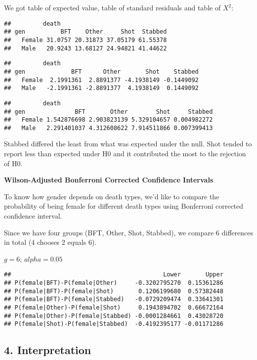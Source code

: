 \documentclass[]{article}
\begin{document}
We got table of expected value, table of standard residuals and table of
\(X^2\):

\begin{verbatim}
##         death
## gen          BFT    Other     Shot  Stabbed
##   Female 31.0757 20.31873 37.05179 61.55378
##   Male   20.9243 13.68127 24.94821 41.44622
\end{verbatim}

\begin{verbatim}
##         death
## gen             BFT      Other       Shot    Stabbed
##   Female  2.1991361  2.8891377 -4.1938149 -0.1449092
##   Male   -2.1991361 -2.8891377  4.1938149  0.1449092
\end{verbatim}

\begin{verbatim}
##         death
## gen              BFT       Other        Shot     Stabbed
##   Female 1.542876698 2.903823139 5.329104657 0.004982272
##   Male   2.291401037 4.312608622 7.914511866 0.007399413
\end{verbatim}

 Stabbed differed the least from what was expected under the null. Shot
tended to report less than expected under H0 and it contributed the most
to the rejection of H0.

\textbf{Wilson-Adjusted Bonferroni Corrected Confidence Intervals}

To know how gender depends on death types, we'd like to compare the
probability of being female for different death types using Bonferroni
corrected confidence interval.

Since we have four groups (BFT, Other, Shot, Stabbed), we compare 6
differences in total (4 chooses 2 equals 6).

\(g = 6\); \(alpha = 0.05\)

\begin{verbatim}
##                                           Lower       Upper
## P(female|BFT)-P(female|Other)     -0.3202795270  0.15361286
## P(female|BFT)-P(female|Shot)       0.1206199680  0.57382448
## P(female|BFT)-P(female|Stabbed)   -0.0729209474  0.33641301
## P(female|Other)-P(female|Shot)     0.1943894702  0.66672164
## P(female|Other)-P(female|Stabbed) -0.0001284661  0.43028720
## P(female|Shot)-P(female|Stabbed)  -0.4192395177 -0.01171286
\end{verbatim}

\subsection{4. Interpretation}\label{interpretation}
\end{document}
